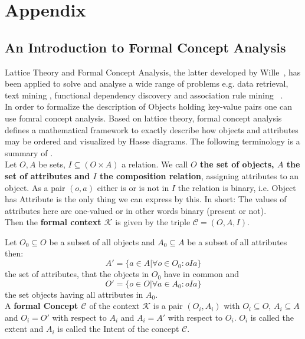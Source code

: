 \chapter{Appendix}

\section{An Introduction to Formal Concept Analysis}\label{\positionnumber}
Lattice Theory and Formal Concept Analysis, the latter developed by Wille~\cite{wille1982restructuring}, has been applied to solve and analyse a wide range of problems e.g. data retrieval, text mining , functional dependency discovery and association rule mining ~\cite{poelmans2012text, soergel1967mathematical, spoerri1993infocrystal, godin1993experimental, godin1993building, carpineto2004exploiting, carpineto2003mining, ganascia1987charade, oosthuizen1988induction, xie2002concept}. \\
In order to formalize the description of Objects holding key-value pairs one can use fomral concept analysis. Based on lattice theory, formal concept analysis defines a mathematical framework to exactly describe how objects and attributes may be ordered and visualized by Hasse diagrams. The following terminology is a summary of \cite{ganter2012formal}. \\

Let $O, A$ be sets, $I \subseteq (O \times A)$ a relation. We call \textbf{$O$ the set of objects, $A$ the set of attributes and $I$ the composition relation}, assigning attributes to an object. As a pair $(o, a)$ either is or is not in $I$ the relation is binary, i.e. Object has Attribute is the only thing we can express by this. In short: The values of attributes here are one-valued or in other words binary (present or not). \\

Then the \textbf{formal context $\mathcal{K}$} is given by the triple $\mathcal{C} = (O, A, I)$. 

Let $O_0 \subseteq O$ be a subset of all objects and $A_0 \subseteq A$ be a subset of all attributes then:
\[ A' = \{ a \in A | \forall o \in O_0: oIa \}  \]
the set of attributes, that the objects in $O_0$ have in common and 
\[ O' = \{ o \in O | \forall a \in A_0: oIa \} \]
the set objects having all attributes in $A_0$. \\

A \textbf{formal Concept $\mathcal{C}$} of the context $\mathcal{K}$ is a pair $(O_i, A_i)$ with $O_i \subseteq O$,  $A_i \subseteq A$ and $O_i = O'$ with respect to $A_i$ and $A_i = A'$ with respect to $O_i$. $O_i$ is called the extent and $A_i$ is called the Intent of the concept $\mathcal{C}$. \\


